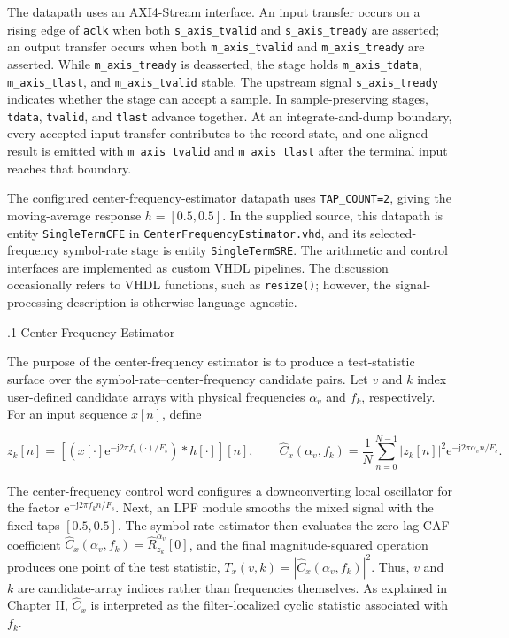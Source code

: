 The datapath uses an AXI4-Stream interface.  An input transfer occurs on a rising edge of \texttt{aclk} when both \texttt{s\_axis\_tvalid} and \texttt{s\_axis\_tready} are asserted; an output transfer occurs when both \texttt{m\_axis\_tvalid} and \texttt{m\_axis\_tready} are asserted.  While \texttt{m\_axis\_tready} is deasserted, the stage holds \texttt{m\_axis\_tdata}, \texttt{m\_axis\_tlast}, and \texttt{m\_axis\_tvalid} stable.  The upstream signal \texttt{s\_axis\_tready} indicates whether the stage can accept a sample.  In sample-preserving stages, \texttt{tdata}, \texttt{tvalid}, and \texttt{tlast} advance together.  At an integrate-and-dump boundary, every accepted input transfer contributes to the record state, and one aligned result is emitted with \texttt{m\_axis\_tvalid} and \texttt{m\_axis\_tlast} after the terminal input reaches that boundary.

The configured center-frequency-estimator datapath uses \texttt{TAP\_COUNT=2}, giving the moving-average response $h=[0.5,0.5]$.  In the supplied source, this datapath is entity \texttt{SingleTermCFE} in \texttt{CenterFrequencyEstimator.vhd}, and its selected-frequency symbol-rate stage is entity \texttt{SingleTermSRE}.  The arithmetic and control interfaces are implemented as custom VHDL pipelines.  The discussion occasionally refers to VHDL functions, such as \texttt{resize()}; however, the signal-processing description is otherwise language-agnostic.

%
%
\medskip
{}
.1  \quad Center-Frequency Estimator

The purpose of the center-frequency estimator is to produce a test-statistic surface over the symbol-rate--center-frequency candidate pairs.  Let $v$ and $k$ index user-defined candidate arrays with physical frequencies $\alpha_v$ and $f_k$, respectively.  For an input sequence $x[n]$, define

\begin{equation*}
z_k[n]=\left[\left(x[\cdot]\mathrm{e}^{-\mathrm{j}2\pi f_k(\cdot)/F_s}\right)\ast h[\cdot]\right][n],
\qquad
\widehat{C}_{x}(\alpha_v,f_k)=\frac{1}{N}\sum_{n=0}^{N-1}|z_k[n]|^{2}\mathrm{e}^{-\mathrm{j}2\pi\alpha_v n/F_s}.
\end{equation*}

The center-frequency control word configures a downconverting local oscillator for the factor $\mathrm{e}^{-\mathrm{j}2\pi f_k n/F_s}$.  Next, an LPF module smooths the mixed signal with the fixed taps $[0.5,0.5]$.  The symbol-rate estimator then evaluates the zero-lag CAF coefficient $\widehat{C}_{x}(\alpha_v,f_k)=\widehat{R}_{z_k}^{\alpha_v}[0]$, and the final magnitude-squared operation produces one point of the test statistic, $T_x(v,k)=|\widehat{C}_{x}(\alpha_v,f_k)|^{2}$.  Thus, $v$ and $k$ are candidate-array indices rather than frequencies themselves.  As explained in Chapter II, $\widehat{C}_{x}$ is interpreted as the filter-localized cyclic statistic associated with $f_k$.

